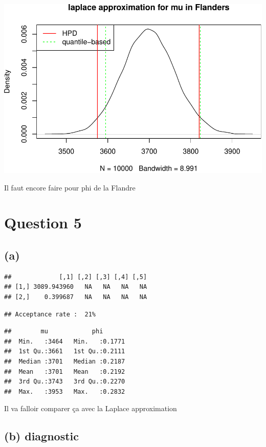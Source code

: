 \documentclass[a4paper, 12pt]{article}
\begin{document}
    \begin{center}\includegraphics[width=0.8\linewidth]{resources/figs/unnamed-chunk-12-1} \end{center}

    Il faut encore faire pour phi de la Flandre

    \hypertarget{question-5}{%
    \section{Question 5}\label{question-5}}

    \hypertarget{a}{%
    \subsection{(a)}\label{a}}

\begin{verbatim}
##             [,1] [,2] [,3] [,4] [,5]
## [1,] 3089.943960   NA   NA   NA   NA
## [2,]    0.399687   NA   NA   NA   NA
\end{verbatim}

\begin{verbatim}
## Acceptance rate :  21%
\end{verbatim}

\begin{verbatim}
##        mu            phi        
##  Min.   :3464   Min.   :0.1771  
##  1st Qu.:3661   1st Qu.:0.2111  
##  Median :3701   Median :0.2187  
##  Mean   :3701   Mean   :0.2192  
##  3rd Qu.:3743   3rd Qu.:0.2270  
##  Max.   :3953   Max.   :0.2832
\end{verbatim}

    Il va falloir comparer ça avec la Laplace approximation

    \hypertarget{b-diagnostic}{%
    \subsection{(b) diagnostic}\label{b-diagnostic}}
\end{document}
